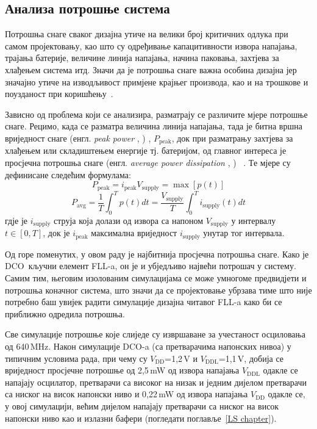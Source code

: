 \documentclass[master]{finthesis}
\makeatletter
\newcommand*{\engl}[2][\@empty]{%
    \edef\theacronym{#1}%
    (енгл. \foreignlanguage{english}{\emph{#2}%
    \ifx\theacronym\@empty \else , #1\fi})%
}
\def \FLL  {FLL} %
\def \DCO  {DCO} %
\makeatother
\begin{document}
\subsection{Анализа потрошње система} \label{section:impl:dco_pwr}
Потрошња снаге сваког дизајна утиче на велики број критичних одлука при самом пројектовању, као што су одређивање капацитивности извора напајања, трајања батерије, величине линија напајања, начина паковања, захтјева за хлађењем система итд. Значи да је потрошња снаге важна особина дизајна јер значајно утиче на изводљивост примјене крајњег производа, као и на трошкове и поузданост при коришћењу~\cite{RABAEY:2003digital}. \par
Зависно од проблема који се анализира, разматрају се различите мјере потрошње снаге. Рецимо, када се разматра величина линија напајања, тада је битна вршна вриједност снаге \engl{peak power}, $P_\text{peak}$, док при разматрању захтјева за хлађењем или складиштењем енергије тј. батеријом, од главног интереса је просјечна потрошња снаге \engl{average power dissipation}~\cite{RABAEY:2003digital}. Те мјере су дефинисане следећим формулама:
\begin{equation}
	\label{eq:impl:dco_pwr:peak}
	P_\text{peak} = i_\text{peak}V_\text{supply} = \max [p(t)]
\end{equation}
\begin{equation}
	\label{eq:impl:dco_pwr:av}
	P_\text{avg} = \frac{1}{T}\int_{0}^{T}p(t)dt = \frac{V_\text{supply}}{T}\int_{0}^{T}i_\text{supply}(t)dt
\end{equation}
гдје је $i_\text{supply}$ струја која долази од извора са напоном $V_\text{supply}$ у интервалу $t \in [0,T]$, док је $i_\text{peak}$ максимална вриједност $i_\text{supply}$ унутар тог интервала. \par
Од горе поменутих, у овом раду је најбитнија просјечна потрошња снаге. Како је \DCO\ кључни елемент \FLL-a, он је и убједљиво највећи потрошач у систему. Самим тим, његовим изолованим симулацијама се може умногоме предвидјети и потрошња коначног система, што значи да се пројектовање убрзава тиме што није потребно баш увијек радити симулације дизајна читавог \FLL-a како би се приближно одредила потрошња. \par
Све симулације потрошње које слиједе су извршаване за учестаност осциловања од 640\,MHz. Након симулације \DCO-a (са претварачима напонских нивоа) у типичним условима рада, при чему су $V_\text{DD}$=1,2\,V и $V_\text{DDL}$=1,1\,V, добија се вриједност просјечне потрошње од 2,5\,mW од извора напајања $V_\text{DDL}$ одакле се напајају осцилатор, претварачи са високог на низак и једним дијелом претварачи са ниског на висок напонски ниво и 0,22\,mW од извора напајања $V_\text{DD}$ одакле се, у овој симулацији, већим дијелом напајају претварачи са ниског на висок напонски ниво као и излазни бафери (погледати поглавље~\ref{LS chapter}). \par
\end{document}
